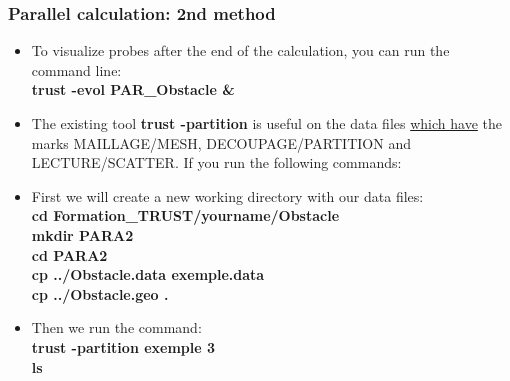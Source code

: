 \documentclass[10pt, hyperref={unicode=true,pdfusetitle, bookmarks=true,bookmarksnumbered=false,bookmarksopen=false, breaklinks=false,pdfborder={0 0 1},backref=true,colorlinks=true,linkcolor=darkblue,pageanchor}]{beamer}
\begin{document}
\begin{frame}
\frametitle{Parallel calculation: 2nd method} \label{exo_para_2}
\begin{block}{}

\begin{itemize}
\item To visualize probes after the end of the calculation, you can run the command line:\\
\textbf{trust -evol PAR\_Obstacle \&}

\item The existing tool \textbf{trust -partition} is useful on the data files \underline{which have} the marks MAILLAGE/MESH, DECOUPAGE/PARTITION and LECTURE/SCATTER. If you run the following commands: \\
\vspace{0.2cm}

\item First we will create a new working directory with our data files:\\
\textbf{cd Formation\_TRUST/yourname/Obstacle} \\
\textbf{mkdir PARA2} \\
\textbf{cd PARA2} \\
\textbf{cp ../Obstacle.data exemple.data}\\
\textbf{cp ../Obstacle.geo .}\\
\vspace{0.2cm}

\item Then we run the command:\\
\textbf{trust -partition exemple 3}\\
\textbf{ls}
\end{itemize}

\end{block}
\end{frame}
\end{document}
